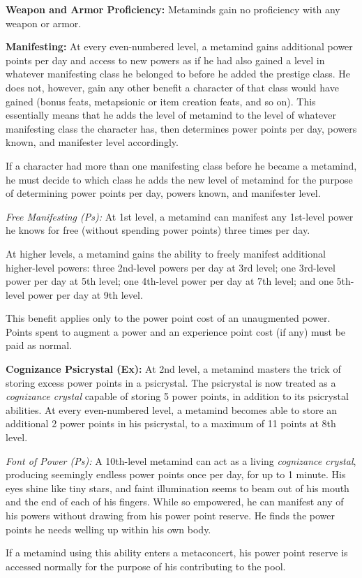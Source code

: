 {
\textbf{Weapon and Armor Proficiency:} Metaminds gain no proficiency with any weapon or armor.

\textbf{Manifesting:} At every even-numbered level, a metamind gains additional power points per day and access to new powers as if he had also gained a level in whatever manifesting class he belonged to before he added the prestige class. He does not, however, gain any other benefit a character of that class would have gained (bonus feats, metapsionic or item creation feats, and so on). This essentially means that he adds the level of metamind to the level of whatever manifesting class the character has, then determines power points per day, powers known, and manifester level accordingly.

If a character had more than one manifesting class before he became a metamind, he must decide to which class he adds the new level of metamind for the purpose of determining power points per day, powers known, and manifester level.

\textit{Free Manifesting (Ps):} At 1st level, a metamind can manifest any 1st-level power he knows for free (without spending power points) three times per day.

At higher levels, a metamind gains the ability to freely manifest additional higher-level powers: three 2nd-level powers per day at 3rd level; one 3rd-level power per day at 5th level; one 4th-level power per day at 7th level; and one 5th-level power per day at 9th level.

This benefit applies only to the power point cost of an unaugmented power. Points spent to augment a power and an experience point cost (if any) must be paid as normal.

\textbf{Cognizance Psicrystal (Ex):} At 2nd level, a metamind masters the trick of storing excess power points in a psicrystal. The psicrystal is now treated as a \emph{cognizance crystal} capable of storing 5 power points, in addition to its psicrystal abilities. At every even-numbered level, a metamind becomes able to store an additional 2 power points in his psicrystal, to a maximum of 11 points at 8th level.

\textit{Font of Power (Ps):} A 10th-level metamind can act as a living \emph{cognizance crystal}, producing seemingly endless power points once per day, for up to 1 minute. His eyes shine like tiny stars, and faint illumination seems to beam out of his mouth and the end of each of his fingers. While so empowered, he can manifest any of his powers without drawing from his power point reserve. He finds the power points he needs welling up within his own body.

If a metamind using this ability enters a metaconcert, his power point reserve is accessed normally for the purpose of his contributing to the pool.
}
